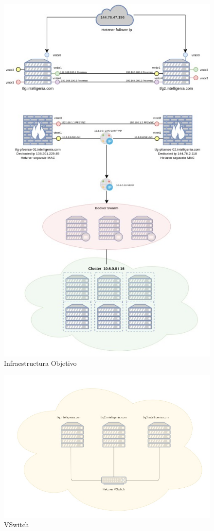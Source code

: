         \begin{figure}[!hbt]
                \label{InfraestructuraObjetivo}
                \centering
                \includegraphics[scale=0.75]{imagenes/Analisis/diagrama.jpg}
                \caption[Infraestructura Objetivo]{Infraestructura Objetivo}
        \end{figure}

        \begin{figure}[!hbt]
                \centering
                \includegraphics[scale=0.4]{imagenes/Analisis/vswitch.jpg}
                \caption[VSwitch]{VSwitch}
                \label{VSwitch}
        \end{figure}